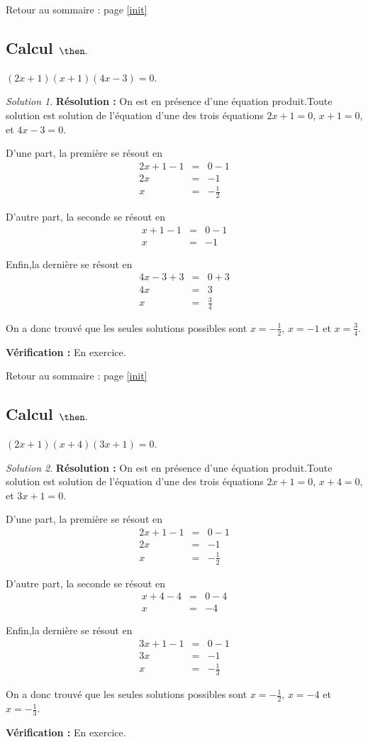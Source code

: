 \documentclass[14pt]{article}
\theoremstyle{remark}
\newtheorem*{sol}{Solution}
\newcounter{n}
\renewcommand{\it}{Retour au sommaire : page \ref{init}
	\subsection{Calcul $ \mathbf{ \then}.$}\label{\then} \stepcounter{n} }
\theoremstyle{plain}
\begin{document}
\it $(2x+1)(x+1)(4x-3) = 0$.
\begin{sol}
\textbf{Résolution :}
On est en présence d'une équation produit.Toute solution est solution de l'équation d'une des trois équations $2x+1=0$, $x+1=0$, et $4x-3=0$. 

D'une part, la première se résout en 
\begin{eqnarray*}
2x+1-1 &=& 0-1 \\
2x &=& -1\\
x&=& -\frac12
\end{eqnarray*}

D'autre part, la seconde se résout en 
\begin{eqnarray*}
x+1 -1 &=&0-1 \\
x&=& -1
\end{eqnarray*}

Enfin,la dernière se résout en 
\begin{eqnarray*}
4x-3+3 &=& 0+3\\
4x &=& 3\\
x&=& \frac34
\end{eqnarray*}

On a donc trouvé que les seules solutions possibles sont $x=-\frac12$, $x=-1$ et $x=\frac34$. 


\textbf{Vérification :} En exercice. 
\end{sol}
\it $(2x+1)(x+4)(3x+1)=0$. 
\begin{sol}
\textbf{Résolution :}
On est en présence d'une équation produit.Toute solution est solution de l'équation d'une des trois équations $2x+1=0$, $x+4=0$, et $3x+1=0$. 

D'une part, la première se résout en 
\begin{eqnarray*}
2x+1-1 &=& 0-1 \\
2x &=& -1\\
x&=& -\frac12
\end{eqnarray*}

D'autre part, la seconde se résout en 
\begin{eqnarray*}
x+4 -4 &=&0-4 \\
x&=& -4
\end{eqnarray*}

Enfin,la dernière se résout en 
\begin{eqnarray*}
3x+1-1 &=& 0-1\\
3x &=& -1\\
x&=& -\frac13
\end{eqnarray*}

On a donc trouvé que les seules solutions possibles sont $x=-\frac12$, $x=-4$ et $x=-\frac13$. 


\textbf{Vérification :} En exercice. 
\end{sol}
\end{document}
